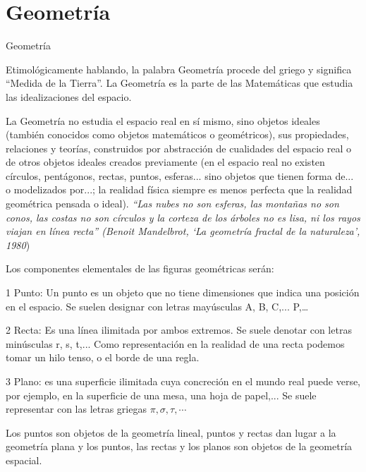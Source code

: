 \part{Geometría}



\begin{myexampleblock}{Geometría}
	
\begin{footnotesize}

\vspace{2mm} Etimológicamente hablando, la palabra Geometría procede del griego y significa ``Medida de la Tierra''. La Geometría es la parte de las Matemáticas que estudia las idealizaciones del espacio.

\vspace{2mm} La Geometría no estudia el espacio real en sí mismo, sino objetos ideales (también conocidos como objetos matemáticos o geométricos), sus propiedades, relaciones y teorías, construidos por abstracción de cualidades del espacio real o de otros objetos ideales creados previamente (en el espacio real no existen círculos, pentágonos, rectas, puntos, esferas... sino objetos que tienen forma de... o modelizados por...; la realidad física siempre es menos perfecta que la realidad geométrica pensada o ideal). \textcolor{gris}{\emph{``Las nubes no son esferas, las montañas no son conos, las costas no son círculos y la corteza de los árboles no es lisa, ni los rayos viajan en línea recta'' (Benoit Mandelbrot, `La geometría fractal de la naturaleza', 1980})}

\vspace{2mm} Los componentes elementales de las figuras geométricas serán:

1 Punto: Un punto es un objeto que no tiene dimensiones que indica una posición en el espacio. Se suelen designar con letras mayúsculas A, B, C,... P,…

2 Recta: Es una línea ilimitada por ambos extremos. Se suele denotar con letras minúsculas r, s, t,... Como representación en la realidad de una recta podemos tomar un hilo tenso, o el borde de una regla.
 
3 Plano: es una superficie ilimitada cuya concreción en el mundo real puede verse, por ejemplo, en la superficie de una mesa, una hoja de papel,... Se suele representar con las letras griegas $\pi, \sigma, \tau, \cdots$

\vspace{2mm} Los puntos son objetos de la geometría lineal, puntos y rectas dan lugar a la geometría plana y los puntos, las rectas y los planos son objetos de la geometría espacial.


\end{footnotesize}
\end{myexampleblock}
